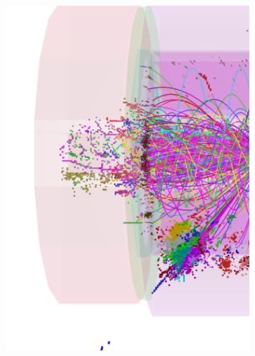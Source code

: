 \begin{figure}[tbph]
\centering
  \begin{subfigure}[b]{0.45\textwidth}
    \includegraphics[width=\textwidth]{pandora/evtDisplayggHad1}
    \caption{}
    \label{fig:pandoraEvtDisplayggHad1}
  \end{subfigure}
  \begin{subfigure}[b]{0.45\textwidth}

\end{subfigure}
\end{figure}
